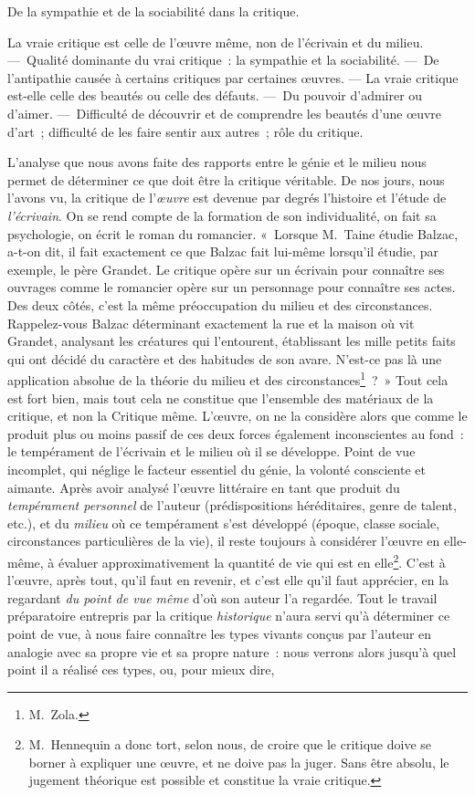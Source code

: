\documentclass[french,twoside]{book} %
\newcommand\chaptercont{} %
\begin{document}
\begin{center}De la sympathie et de la sociabilité dans la critique.\end{center}

\chaptercont
\noindent La vraie critique est celle de l’œuvre même, non de l’écrivain et du milieu. — Qualité dominante du vrai critique : la sympathie et la sociabilité. — De l’antipathie causée à certains critiques par certaines œuvres. — La vraie critique est-elle celle des beautés ou celle des défauts. — Du pouvoir d’admirer ou d’aimer. — Difficulté de découvrir et de comprendre les beautés d’une œuvre d’art ; difficulté de les faire sentir aux autres ; rôle du critique.\par
L’analyse que nous avons faite des rapports entre le génie et le milieu nous permet de déterminer ce que doit être la critique véritable. De nos jours, nous l’avons vu, la critique de l’\emph{œuvre} est devenue par degrés l’histoire et l’étude de \emph{l’écrivain}. On se rend compte de la formation de son individualité, on fait sa psychologie, on écrit le roman du romancier. « Lorsque M. Taine étudie Balzac, a-t-on dit, il fait exactement ce que Balzac fait lui-même lorsqu’il étudie, par exemple, le père Grandet. Le critique opère sur un écrivain pour connaître ses ouvrages comme le romancier opère sur un personnage pour connaître ses actes. Des deux côtés, c’est la même préoccupation du milieu et des circonstances. Rappelez-vous Balzac déterminant exactement la rue et la maison où vit Grandet, analysant les créatures qui l’entourent, établissant les mille petits faits qui ont décidé du caractère et des habitudes de son avare. N’est-ce pas là une application absolue de la théorie du milieu et des circonstances\footnote{M. Zola.} ? » Tout cela est fort bien, mais tout cela ne constitue que l’ensemble des matériaux de la critique, et non la Critique même. L’œuvre, on ne la considère alors que comme le produit plus ou moins passif de ces deux forces également inconscientes au fond : le tempérament de l’écrivain et le milieu où il se développe. Point de vue incomplet, qui néglige le facteur essentiel du génie, la volonté consciente et aimante. Après avoir analysé l’œuvre littéraire en tant que produit du \emph{tempérament personnel} de l’auteur (prédispositions héréditaires, genre de talent, etc.), et du \emph{milieu} où ce tempérament s’est développé (époque, classe sociale, circonstances particulières de la vie), il reste toujours à considérer l’œuvre en elle-même, à évaluer approximativement la quantité de vie qui est en elle\footnote{M. Hennequin a donc tort, selon nous, de croire que le critique doive se borner à expliquer une œuvre, et ne doive pas la juger. Sans être absolu, le jugement théorique est possible et constitue la vraie critique.}. C’est à l’œuvre, après tout, qu’il faut en revenir, et c’est elle qu’il faut apprécier, en la regardant \emph{du point de vue même} d’où son auteur l’a regardée. Tout le travail préparatoire entrepris par la critique \emph{historique} n’aura servi qu’à déterminer ce point de vue, à nous faire connaître les types vivants conçus par l’auteur en analogie avec sa propre vie et sa propre nature : nous verrons alors jusqu’à quel point il a réalisé ces types, ou, pour mieux dire, 
\end{document}

